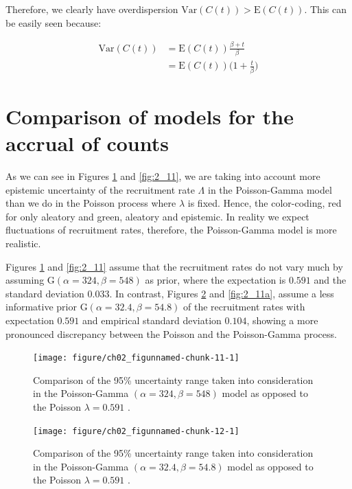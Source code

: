 Therefore, we clearly have overdispersion $\textrm{Var}(C(t))>\textrm{E}(C(t))$. This can be easily seen because:

\begin{align*}
\textrm{Var}(C(t)) &=\textrm{E}(C(t))\frac{\beta+t}{\beta}\\
&=\textrm{E}(C(t))\Bigg ( 1+\frac{t}{\beta} \Bigg)
\end{align*}

\section{Comparison of models for the accrual of counts}

As we can see in Figures \ref{fig:2_10} and \ref{fig:2_11}, we are taking into account more epistemic uncertainty of the recruitment rate $\Lambda$ in the Poisson-Gamma model than we do in the Poisson process where $\lambda$ is fixed. Hence, the color-coding, red for only aleatory and green, aleatory and epistemic. In reality we expect fluctuations of recruitment rates, therefore, the Poisson-Gamma model is more realistic.

Figures \ref{fig:2_10} and \ref{fig:2_11} assume that the recruitment rates do not vary much by assuming $\textrm{G}(\alpha = 324, \beta = 548)$ as prior, where the expectation is $0.591$ and the standard deviation $0.033$. In contrast, Figures \ref{fig:2_10a} and \ref{fig:2_11a}, assume a less informative prior $\textrm{G}(\alpha = 32.4, \beta = 54.8)$ of the recruitment rates with expectation $0.591$ and empirical standard deviation $0.104$, showing a more pronounced discrepancy between the Poisson and the Poisson-Gamma process.

\begin{figure}
\begin{knitrout}
\color{fgcolor}

{\centering \texttt{[image: figure/ch02\_figunnamed-chunk-11-1]} 

}


\end{knitrout}
  \caption{Comparison of the 95\% uncertainty range taken into consideration in the Poisson-Gamma $(\alpha = 324, \beta = 548)$ model as opposed to the Poisson $\lambda = 0.591$ \citep{spiegelhalter2011visualizing, pkgacc}.}
  \label{fig:2_10}
\end{figure}


\begin{figure}
\begin{knitrout}
\color{fgcolor}

{\centering \texttt{[image: figure/ch02\_figunnamed-chunk-12-1]} 

}


\end{knitrout}
  \caption{Comparison of the 95\% uncertainty range taken into consideration in the Poisson-Gamma $(\alpha = 32.4, \beta = 54.8)$ model as opposed to the Poisson $\lambda = 0.591$ \citep{spiegelhalter2011visualizing, pkgacc}.}
  \label{fig:2_10a}
\end{figure}

